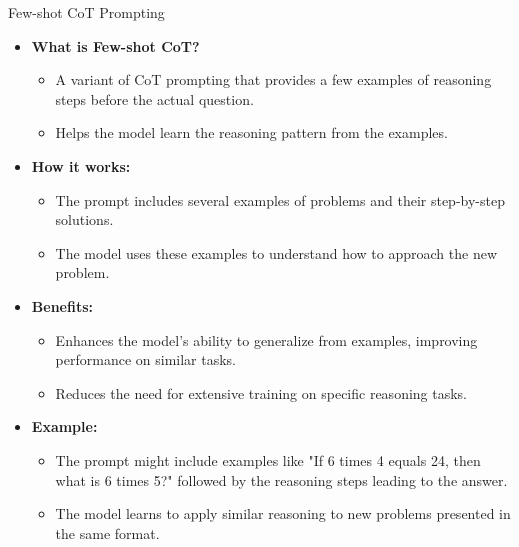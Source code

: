 \begin{frame}[allowframebreaks]{Few-shot CoT Prompting}
    \begin{itemize}
        \item \textbf{What is Few-shot CoT?}
        \begin{itemize}
            \item A variant of CoT prompting that provides a few examples of reasoning steps before the actual question.
            \item Helps the model learn the reasoning pattern from the examples.
        \end{itemize}
        \item \textbf{How it works:}
        \begin{itemize}
            \item The prompt includes several examples of problems and their step-by-step solutions.
            \item The model uses these examples to understand how to approach the new problem.
        \end{itemize}
    \framebreak
        \item \textbf{Benefits:}
        \begin{itemize}
            \item Enhances the model's ability to generalize from examples, improving performance on similar tasks.
            \item Reduces the need for extensive training on specific reasoning tasks.
        \end{itemize}
        \item \textbf{Example:}
        \begin{itemize}
            \item The prompt might include examples like "If 6 times 4 equals 24, then what is 6 times 5?" followed by the reasoning steps leading to the answer.
            \item The model learns to apply similar reasoning to new problems presented in the same format.
        \end{itemize}
    \end{itemize}
\end{frame}


